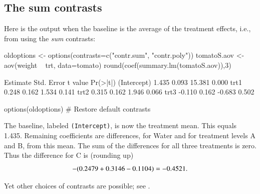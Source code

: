 \subsection*{The sum contrasts}

Here is the output when the baseline is the average of
the treatment effects, i.e., from using the \textit{sum} contrasts:
\begin{Schunk}
\begin{Sinput}
oldoptions <- options(contrasts=c("contr.sum",
                                  "contr.poly"))
tomatoS.aov <- aov(weight ~ trt, data=tomato)
round(coef(summary.lm(tomatoS.aov)),3)
\end{Sinput}
\begin{Soutput}
            Estimate Std. Error t value Pr(>|t|)
(Intercept)    1.435      0.093  15.381    0.000
trt1           0.248      0.162   1.534    0.141
trt2           0.315      0.162   1.946    0.066
trt3          -0.110      0.162  -0.683    0.502
\end{Soutput}
\begin{Sinput}
options(oldoptions)  # Restore default contrasts
\end{Sinput}
\end{Schunk}
{}
The baseline, labeled \verb!(Intercept)!, is now
the treatment mean.  This equals 1.435. Remaining coefficients are
differences, for Water and for treatment levels A and B, from this
mean.  The sum of the differences for all three treatments is zero.
Thus the difference for C is (rounding up) \vspace*{-2pt}
\[
-(0.2479+ 0.3146-0.1104) = -0.4521 .\vspace*{-2pt}\]

Yet other choices of contrasts are possible; see
.

